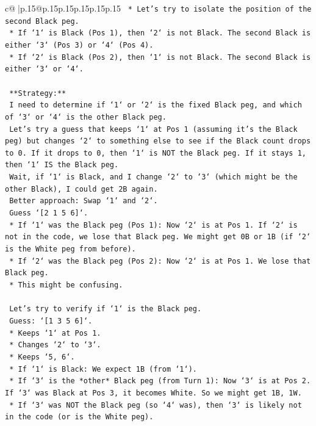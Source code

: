 \documentclass{article}
\begin{document}
{\begin{supertabular}{c@{$\;$}|p{.15\linewidth}@{}p{.15\linewidth}p{.15\linewidth}p{.15\linewidth}p{.15\linewidth}p{.15\linewidth}}
{{{\texttt{    *   Let's try to isolate the position of the second Black peg.} \\
\texttt{    *   If `1` is Black (Pos 1), then `2` is not Black. The second Black is either `3` (Pos 3) or `4` (Pos 4).} \\
\texttt{    *   If `2` is Black (Pos 2), then `1` is not Black. The second Black is either `3` or `4`.} \\
\\ 
\texttt{    **Strategy:**} \\
\texttt{    I need to determine if `1` or `2` is the fixed Black peg, and which of `3` or `4` is the other Black peg.} \\
\texttt{    Let's try a guess that keeps `1` at Pos 1 (assuming it's the Black peg) but changes `2` to something else to see if the Black count drops to 0. If it drops to 0, then `1` is NOT the Black peg. If it stays 1, then `1` IS the Black peg.} \\
\texttt{    Wait, if `1` is Black, and I change `2` to `3` (which might be the other Black), I could get 2B again.} \\
\texttt{    Better approach: Swap `1` and `2`.} \\
\texttt{    Guess `{[}2 1 5 6{]}`.} \\
\texttt{    *   If `1` was the Black peg (Pos 1): Now `2` is at Pos 1. If `2` is not in the code, we lose that Black peg. We might get 0B or 1B (if `2` is the White peg from before).} \\
\texttt{    *   If `2` was the Black peg (Pos 2): Now `2` is at Pos 1. We lose that Black peg.} \\
\texttt{    *   This might be confusing.} \\
\\ 
\texttt{    Let's try to verify if `1` is the Black peg.} \\
\texttt{    Guess: `{[}1 3 5 6{]}`.} \\
\texttt{    *   Keeps `1` at Pos 1.} \\
\texttt{    *   Changes `2` to `3`.} \\
\texttt{    *   Keeps `5, 6`.} \\
\texttt{    *   If `1` is Black: We expect 1B (from `1`).} \\
\texttt{    *   If `3` is the *other* Black peg (from Turn 1): Now `3` is at Pos 2. If `3` was Black at Pos 3, it becomes White. So we might get 1B, 1W.} \\
\texttt{    *   If `3` was NOT the Black peg (so `4` was), then `3` is likely not in the code (or is the White peg).} \\
}}}
\end{supertabular}}
\end{document}

